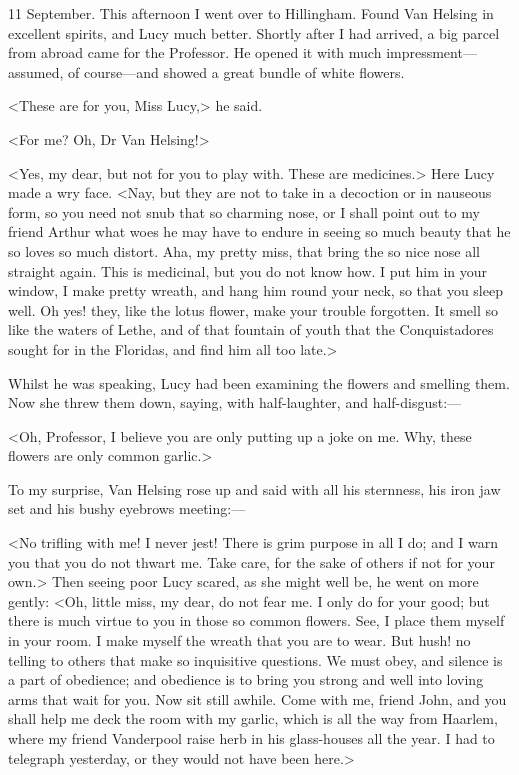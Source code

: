 \begin{diary}{11 September.}
This afternoon I went over to Hillingham. Found Van Helsing in excellent spirits, and Lucy much better. Shortly after I had arrived, a big parcel from abroad came for the Professor. He opened it with much impressment—assumed, of course—and showed a great bundle of white flowers.

<These are for you, Miss Lucy,> he said.

<For me? Oh, Dr Van Helsing!>

<Yes, my dear, but not for you to play with. These are medicines.> Here Lucy made a wry face. <Nay, but they are not to take in a decoction or in nauseous form, so you need not snub that so charming nose, or I shall point out to my friend Arthur what woes he may have to endure in seeing so much beauty that he so loves so much distort. Aha, my pretty miss, that bring the so nice nose all straight again. This is medicinal, but you do not know how. I put him in your window, I make pretty wreath, and hang him round your neck, so that you sleep well. Oh yes! they, like the lotus flower, make your trouble forgotten. It smell so like the waters of Lethe, and of that fountain of youth that the Conquistadores sought for in the Floridas, and find him all too late.>

Whilst he was speaking, Lucy had been examining the flowers and smelling them. Now she threw them down, saying, with half-laughter, and half-disgust:—

<Oh, Professor, I believe you are only putting up a joke on me. Why, these flowers are only common garlic.>

To my surprise, Van Helsing rose up and said with all his sternness, his iron jaw set and his bushy eyebrows meeting:—

<No trifling with me! I never jest! There is grim purpose in all I do; and I warn you that you do not thwart me. Take care, for the sake of others if not for your own.> Then seeing poor Lucy scared, as she might well be, he went on more gently: <Oh, little miss, my dear, do not fear me. I only do for your good; but there is much virtue to you in those so common flowers. See, I place them myself in your room. I make myself the wreath that you are to wear. But hush! no telling to others that make so inquisitive questions. We must obey, and silence is a part of obedience; and obedience is to bring you strong and well into loving arms that wait for you. Now sit still awhile. Come with me, friend John, and you shall help me deck the room with my garlic, which is all the way from Haarlem, where my friend Vanderpool raise herb in his glass-houses all the year. I had to telegraph yesterday, or they would not have been here.>


\end{diary}
